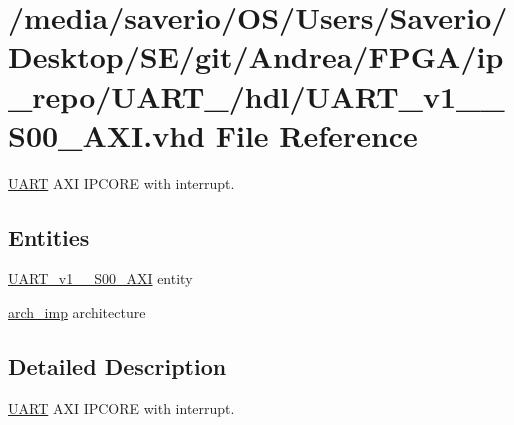 \hypertarget{UART__v1__0__S00__AXI_8vhd}{}\section{/media/saverio/\+O\+S/\+Users/\+Saverio/\+Desktop/\+S\+E/git/\+Andrea/\+F\+P\+G\+A/ip\+\_\+repo/\+U\+A\+R\+T\+\_/hdl/\+U\+A\+R\+T\+\_\+v1\+\_\+\_\+\+S00\+\_\+\+A\+XI.vhd File Reference}
\label{UART__v1__0__S00__AXI_8vhd}


\hyperlink{structUART}{U\+A\+RT} A\+XI I\+P\+C\+O\+RE with interrupt.  


\subsection*{Entities}
\begin{DoxyCompactItemize}
\item 
\hyperlink{classUART__v1__0__S00__AXI}{U\+A\+R\+T\+\_\+v1\+\_\+\_\+\+S00\+\_\+\+A\+XI} entity
\item 
\hyperlink{classUART__v1__0__S00__AXI_1_1arch__imp}{arch\+\_\+imp} architecture
\end{DoxyCompactItemize}


\subsection{Detailed Description}
\hyperlink{structUART}{U\+A\+RT} A\+XI I\+P\+C\+O\+RE with interrupt. 

